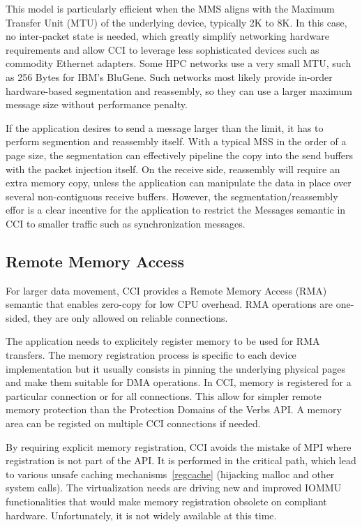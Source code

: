 This model is particularly efficient when the MMS aligns with the Maximum 
Transfer Unit (MTU) of the underlying device, typically 2K to 8K. 
In this case, no inter-packet state is needed, which greatly simplify 
networking hardware requirements and allow CCI to leverage less 
sophisticated devices such as commodity Ethernet adapters. 
Some HPC networks use a very small MTU, such as 256 Bytes for 
IBM's BluGene. Such networks most likely 
provide in-order hardware-based segmentation and reassembly, so they 
can use a larger maximum message size without performance penalty.

If the application desires to send a message larger than the limit, it has 
to perform segmention and reassembly itself. With a typical MSS in the order 
of a page size, the segmentation can effectively pipeline the copy into the 
send buffers with the packet injection itself. On the receive side, 
reassembly will require an extra memory copy, unless the application can 
manipulate the data in place over several non-contiguous receive buffers.
However, the segmentation/reassembly effor is a clear incentive for the 
application to restrict the Messages semantic in CCI to smaller traffic 
such as synchronization messages.

\subsection{Remote Memory Access}
For larger data movement, CCI provides a Remote Memory Access (RMA) semantic 
that enables zero-copy for low CPU overhead. RMA operations are one-sided, 
they are only allowed on reliable connections. 

The application needs to explicitely register memory to be used for RMA 
transfers. The memory registration process is specific to each device 
implementation but it usually consists in pinning the underlying physical 
pages and make them suitable for DMA operations. In CCI, memory is registered 
for a particular connection or for all connections. This allow for simpler 
remote memory protection than the Protection Domains of the Verbs API. A 
memory area can be registed on multiple CCI connections if needed.

By requiring explicit memory registration, CCI avoids the mistake of MPI 
where registration is not part of the API. It is performed in the critical 
path, which lead to various unsafe caching mechanisms~\ref{regcache} 
(hijacking malloc and other system calls). 
The virtualization needs are driving new and improved IOMMU functionalities 
that would make memory registration obsolete on compliant hardware. 
Unfortunately, it is not widely available at this time.

